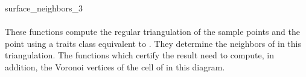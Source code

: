 \begin{ccRefFunction}{surface_neighbors_3}
\ccSeeAlso
{}\\
 \\

\ccImplementation These functions compute the regular triangulation of
the sample points and the point  using a traits class
equivalent to . They determine
the neighbors of  in this triangulation. The functions which
certify the result need to compute, in addition, the Voronoi vertices
of the cell of  in this diagram.

\end{ccRefFunction}
